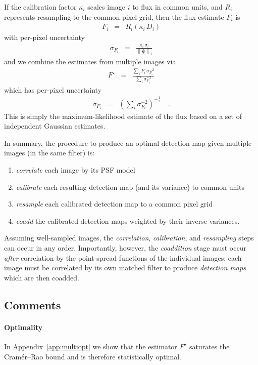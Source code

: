 \documentclass[11pt,letterpaper,linenumbers]{aastex7}
\newcommand{\psf}{\psi}
\newcommand{\psfnorm}{\norm{\bm{\psf}}}
\newcommand{\norm}[1]{\left\lVert #1 \right\rVert}
\begin{document}
If the calibration factor $\kappa_i$ scales image $i$ to flux in
common units, and $R_i$ represents resampling to the common pixel grid,
then the flux estimate $F_i$ is
\begin{eqnarray}
F_i &=& R_i(\kappa_i \, D_i)
\end{eqnarray}
with per-pixel uncertainty
\begin{eqnarray}
\sigma_{F_i} &=& \frac{\kappa_i \, \sigma_{i}}{\psfnorm_i}
\end{eqnarray}
and we combine the estimates from multiple images via
\begin{eqnarray}
F^{\star} &=& \frac{\displaystyle\sum_i F_i \, \sigma^{-2}_{F_i}}{\displaystyle\sum_i \sigma^{-2}_{F_i}}
\label{eq:onebandmap}
\end{eqnarray}
which has per-pixel uncertainty
\begin{eqnarray}
  \sigma_{F_{\star}} &=& \left( \sum_i \sigma^{-2}_{F_i} \right)^{-\frac{1}{2}}    \quad .
  \label{eq:onebandstd}
\end{eqnarray}
This is simply the maximum-likelihood estimate of the flux based on a
set of independent Gaussian estimates.


In summary, the procedure to produce an optimal detection map given
multiple images (in the same filter) is:
\begin{enumerate}
\item \emph{correlate} each image by its PSF model
\item \emph{calibrate} each resulting detection map (and its variance)
  to common units
\item \emph{resample} each calibrated detection map to a common pixel
  grid
\item \emph{coadd} the calibrated detection maps weighted by their
  inverse variances.
\end{enumerate}
Assuming well-sampled images, the \emph{correlation},
\emph{calibration}, and \emph{resampling} steps can occur in any
order.  Importantly, however, the \emph{coaddition} stage must occur
\emph{after} correlation by the point-spread functions of the
individual images; each image must be correlated by its own matched
filter to produce \emph{detection maps} which are then coadded.

\subsection{Comments}

\paragraph{Optimality}
In Appendix~\ref{app:multiopt} we show that the estimator $F^{\star}$
saturates the Cram\'er--Rao bound and is therefore statistically
optimal.
\end{document}
